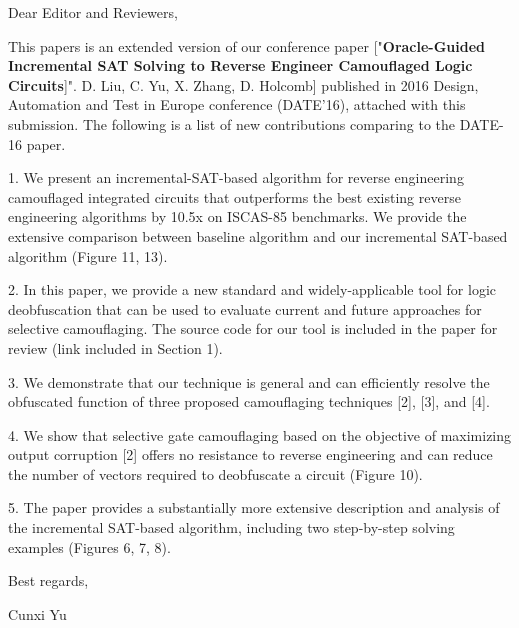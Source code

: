 \documentclass{article}
\begin{document}
\onecolumn

{ Dear Editor and Reviewers,}
\vspace{5mm}

{ This papers is an extended version of our conference paper ["\textbf{Oracle-Guided Incremental SAT Solving to Reverse Engineer Camouflaged Logic Circuits}]". D. Liu, C. Yu, X. Zhang, D. Holcomb] published in 2016 Design, Automation and Test in Europe conference (DATE'16), attached with this submission. The following is a list of new contributions comparing to the DATE-16 paper.}
\vspace{5mm}


{1. We present an incremental-SAT-based algorithm for reverse engineering camouflaged integrated circuits that outperforms the best existing reverse engineering algorithms by 10.5x on ISCAS-85 benchmarks. We provide the extensive comparison between baseline algorithm and our incremental SAT-based algorithm (Figure 11, 13).}


{2. In this paper, we provide a new standard and widely-applicable tool for logic deobfuscation that can be used to evaluate current and future approaches for selective camouflaging. The source code for our tool is included in the paper for review (link included in Section 1).}


{3. We demonstrate that our technique is general and can efficiently resolve the obfuscated function of three proposed camouflaging techniques [2], [3], and [4].}


{4. We show that selective gate camouflaging based on the objective of maximizing output corruption [2] offers no resistance to reverse engineering and can reduce the number of vectors required to deobfuscate a circuit (Figure 10).}


{5. The paper provides a substantially more extensive description and analysis of the incremental SAT-based algorithm, including two step-by-step solving examples (Figures 6, 7, 8).}


\vspace{5mm}
Best regards,

Cunxi Yu
\end{document}
